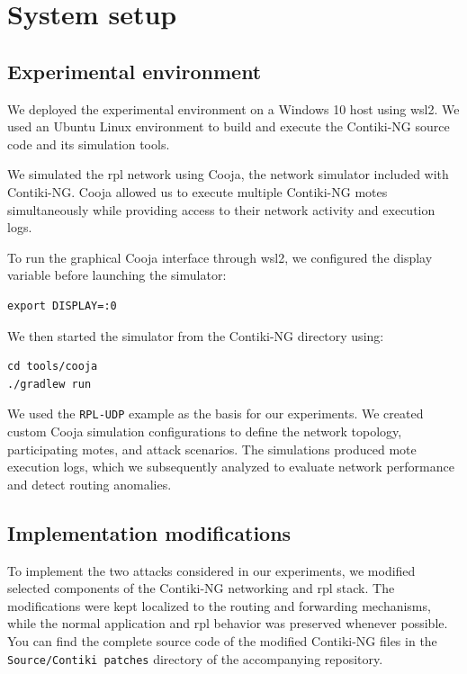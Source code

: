\section{System setup}
\subsection{Experimental environment}
\label{subsec:experimental_environment}

We deployed the experimental environment on a Windows 10 host using \gls{wsl2}. 
We used an Ubuntu Linux environment to build and execute the Contiki-NG source code and its simulation tools.

We simulated the \gls{rpl} network using Cooja, the network simulator included with Contiki-NG. 
Cooja allowed us to execute multiple Contiki-NG motes simultaneously while providing access to their network activity and execution logs.

To run the graphical Cooja interface through \gls{wsl2}, we configured the display variable before launching the simulator:
\begin{verbatim}
export DISPLAY=:0
\end{verbatim}

We then started the simulator from the Contiki-NG directory using:
\begin{verbatim}
cd tools/cooja
./gradlew run
\end{verbatim}

We used the \texttt{RPL-UDP} example as the basis for our experiments. 
We created custom Cooja simulation configurations to define the network topology, participating motes, and attack scenarios. 
The simulations produced mote execution logs, which we subsequently analyzed to evaluate network performance and detect routing anomalies.

\subsection{Implementation modifications}
\label{subsec:implementation_modifications}
To implement the two attacks considered in our experiments, we modified selected components of the Contiki-NG networking and \gls{rpl} stack.
The modifications were kept localized to the routing and forwarding mechanisms, while the normal application and \gls{rpl} behavior was preserved whenever possible.
You can find the complete source code of the modified Contiki-NG files in the \texttt{Source/Contiki patches} directory of the accompanying repository.

